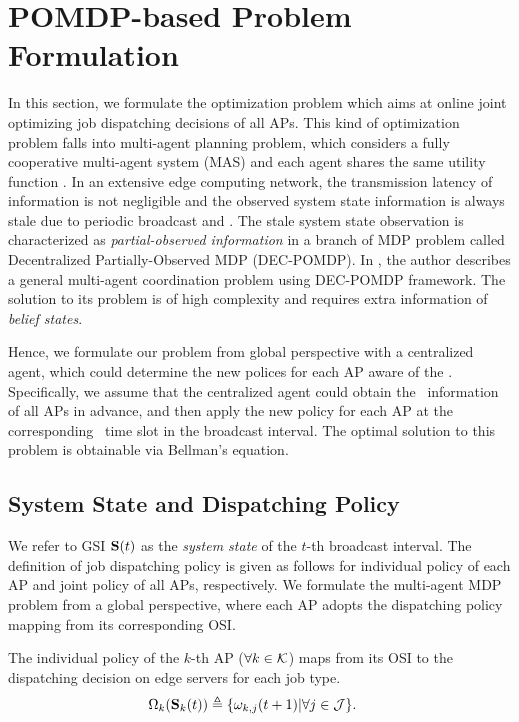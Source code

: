 \section{POMDP-based Problem Formulation}
In this section, we formulate the optimization problem which aims at online joint optimizing job dispatching decisions of all APs.
This kind of optimization problem falls into multi-agent planning problem, which considers a fully cooperative multi-agent system (MAS) and each agent shares the same utility function .
In an extensive edge computing network, the transmission latency of information is not negligible and the observed system state information is always stale due to periodic broadcast and \brlatency.
The stale system state observation is characterized as \emph{partial-observed information} in a branch of MDP problem called Decentralized Partially-Observed MDP (DEC-POMDP).
In , the author describes a general multi-agent coordination problem using DEC-POMDP framework. The solution to its problem is of high complexity and requires extra information of \emph{belief states}.

Hence, we formulate our problem from global perspective with a centralized agent, which could determine the new polices for each AP aware of the \brlatency.
Specifically, we assume that the centralized agent could obtain the \brlatency~information of all APs in advance, and then apply the new policy for each AP at the corresponding \brlatency~time slot in the broadcast interval.
The optimal solution to this problem is obtainable via Bellman's equation.


\subsection{System State and Dispatching Policy}
We refer to GSI $\mathbf{S}(t)$ as the \emph{system state} of the $t$-th broadcast interval.
The definition of job dispatching policy is given as follows for individual policy of each AP and joint policy of all APs, respectively.
We formulate the multi-agent MDP problem from a global perspective, where each AP adopts the dispatching policy mapping from its corresponding OSI.
\begin{definition}
    The individual policy of the $k$-th AP ($\forall k \in\mathcal{K}$) maps from its OSI to the dispatching decision on edge servers for each job type.
    \begin{align}
        &\Omega_{k}(\mathbf{S}_{k}(t)) \triangleq \{\omega_{k,j}(t+1)|\forall j\in\mathcal{J}\}.
        \label{def:action}
    \end{align}
\end{definition}

